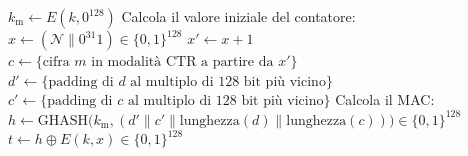 \vspace{1em}
\begin{algorithm}[H]

    \SetAlgoVlined
    \SetAlgoLined
    \caption{Cifratura Autenticata con MAC Carter-Wegman}
    \label{alg:carter_wegman_mac_clean}

    
    $k_{\text{m}} \gets E(k, 0^{128})$\;
    Calcola il valore iniziale del contatore:\;
    \quad $x \gets (\mathcal{N} \parallel 0^{31}1) \in \{0, 1\}^{128}$\;
    \quad $x' \gets x + 1$\;
    $c \gets \{\text{cifra } m \text{ in modalità CTR a partire da } x'\}$\;
    $d' \gets \{\text{padding di } d \text{ al multiplo di 128 bit più vicino}\}$\;
    $c' \gets \{\text{padding di } c \text{ al multiplo di 128 bit più vicino}\}$\;
    Calcola il MAC:\;
    $h \gets \text{GHASH}\big(k_{\text{m}}, (d' \parallel c' \parallel \text{lunghezza}(d) \parallel \text{lunghezza}(c))\big) \in \{0, 1\}^{128}$\;
    \quad $t \gets h \oplus E(k, x) \in \{0, 1\}^{128}$\;
    \;
\end{algorithm}
\vspace{1em}
